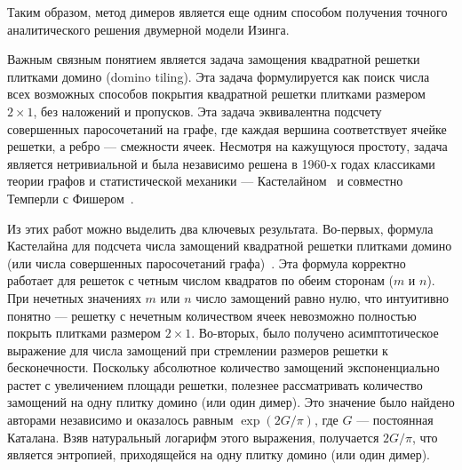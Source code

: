 \documentclass[utf8,12pt]{jetp}
\begin{document}
Таким образом, метод димеров является еще одним способом получения точного аналитического решения двумерной модели Изинга.

Важным связным понятием является задача замощения квадратной решетки плитками домино (domino tiling). Эта задача формулируется как поиск числа всех возможных способов покрытия квадратной решетки плитками размером $2 \times 1$, без наложений и пропусков. Эта задача эквивалентна подсчету совершенных паросочетаний на графе, где каждая вершина соответствует ячейке решетки, а ребро — смежности ячеек. Несмотря на кажущуюся простоту, задача является нетривиальной и была независимо решена в 1960-х годах классиками теории графов и статистической механики — Кастелайном~\cite{kasteleyn1961} и совместно Темперли с Фишером~\cite{temperley1961}.

Из этих работ можно выделить два ключевых результата. Во-первых, формула Кастелайна для подсчета числа замощений квадратной решетки плитками домино (или числа совершенных паросочетаний графа)~\cite{kasteleyn1961}. Эта формула корректно работает для решеток с четным числом квадратов по обеим сторонам ($m$ и $n$). При нечетных значениях $m$ или $n$ число замощений равно нулю, что интуитивно понятно — решетку с нечетным количеством ячеек невозможно полностью покрыть плитками размером $2 \times 1$. Во-вторых, было получено асимптотическое выражение для числа замощений при стремлении размеров решетки к бесконечности. Поскольку абсолютное количество замощений экспоненциально растет с увеличением площади решетки, полезнее рассматривать количество замощений на одну плитку домино (или один димер). Это значение было найдено авторами независимо и оказалось равным $\exp (2G/\pi)$, где $G$ — постоянная Каталана. Взяв натуральный логарифм этого выражения, получается $2G/\pi$, что является энтропией, приходящейся на одну плитку домино (или один димер).
\end{document}

